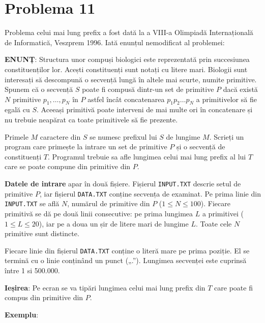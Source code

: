 \section{Problema 11}

Problema celui mai lung prefix a fost dată la a VIII-a Olimpiadă
Internațională de Informatică, Veszprem 1996. Iată enunțul nemodificat al
problemei:

{\bf ENUNȚ}: Structura unor compuși biologici este reprezentată prin
succesiunea constituenților lor. Acești constituenți sunt notați cu litere
mari. Biologii sunt interesați să descompună o secvență lungă în altele mai
scurte, numite primitive. Spunem că o secvență $S$ poate fi compusă dintr-un
set de primitive $P$ dacă există $N$ primitive $p_1, \dots, p_N$ în $P$ astfel
încât concatenarea $p_1 p_2 \dots p_N$ a primitivelor să fie egală cu
$S$. Aceeași primitivă poate interveni de mai multe ori în concatenare și nu
trebuie neapărat ca toate primitivele să fie prezente.

Primele $M$ caractere din $S$ se numesc prefixul lui $S$ de lungime
$M$. Scrieți un program care primește la intrare un set de primitive $P$ și o
secvență de constituenți $T$. Programul trebuie sa afle lungimea celui mai
lung prefix al lui $T$ care se poate compune din primitive din $P$.

{\bf Datele de intrare} apar în două fișiere. Fișierul {\tt INPUT.TXT} descrie
setul de primitive $P$, iar fișierul {\tt DATA.TXT} conține secvența de
examinat. Pe prima linie din {\tt INPUT.TXT} se află $N$, numărul de primitive
din $P$ ($1 \leq N \leq 100$). Fiecare primitivă se dă pe două linii
consecutive: pe prima lungimea $L$ a primitivei ($1 \leq L \leq 20$), iar pe a
doua un șir de litere mari de lungime $L$. Toate cele $N$ primitive sunt
distincte.

Fiecare linie din fișierul {\tt DATA.TXT} conține o literă mare pe prima
poziție. El se termină cu o linie conținând un punct („.”). Lungimea secvenței
este cuprinsă între 1 si 500.000.

{\bf Ieșirea}: Pe ecran se va tipări lungimea celui mai lung prefix din $T$
care poate fi compus din primitive din $P$.

{\bf Exemplu}:

